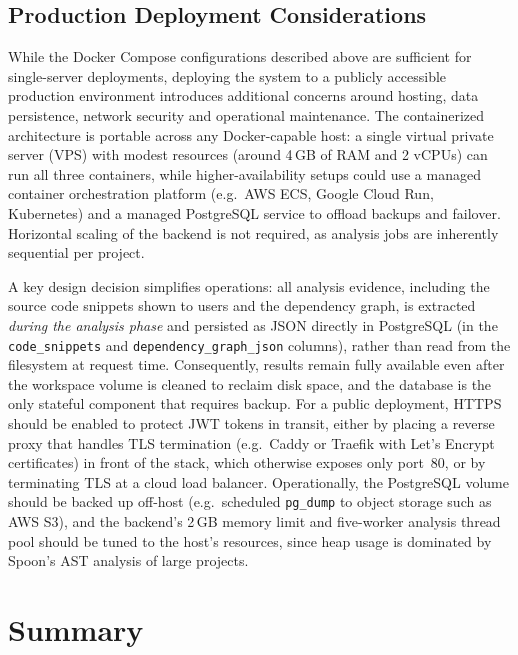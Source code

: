 \subsection{Production Deployment Considerations}
\label{subsec:prod-deployment}

 \par While the Docker Compose configurations described above are sufficient for single-server deployments, deploying the system to a publicly accessible production environment introduces additional concerns around hosting, data persistence, network security and operational maintenance. The containerized architecture is portable across any Docker-capable host: a single virtual private server (VPS) with modest resources (around 4\,GB of RAM and 2 vCPUs) can run all three containers, while higher-availability setups could use a managed container orchestration platform (e.g.\ AWS ECS, Google Cloud Run, Kubernetes) and a managed PostgreSQL service to offload backups and failover. Horizontal scaling of the backend is not required, as analysis jobs are inherently sequential per project.

 \par A key design decision simplifies operations: all analysis evidence, including the source code snippets shown to users and the dependency graph, is extracted \textit{during the analysis phase} and persisted as JSON directly in PostgreSQL (in the \texttt{code\_snippets} and \texttt{dependency\_graph\_json} columns), rather than read from the filesystem at request time. Consequently, results remain fully available even after the workspace volume is cleaned to reclaim disk space, and the database is the only stateful component that requires backup. For a public deployment, HTTPS should be enabled to protect JWT tokens in transit, either by placing a reverse proxy that handles TLS termination (e.g.\ Caddy or Traefik with Let's Encrypt certificates) in front of the stack, which otherwise exposes only port~80, or by terminating TLS at a cloud load balancer. Operationally, the PostgreSQL volume should be backed up off-host (e.g.\ scheduled \texttt{pg\_dump} to object storage such as AWS S3), and the backend's 2\,GB memory limit and five-worker analysis thread pool should be tuned to the host's resources, since heap usage is dominated by Spoon's AST analysis of large projects.

\section{Summary}
\label{sec:ch4-summary}

